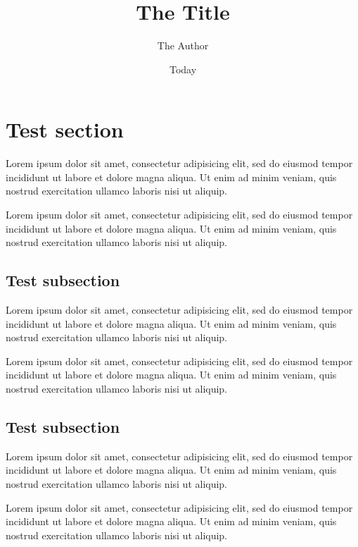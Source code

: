 \documentclass[12pt]{article}
\title{The Title}
\author{The Author}
\date{Today}
\begin{document}
%
%

%
%
\maketitle

%
%

\section{Test section}

Lorem ipsum dolor sit amet, consectetur adipisicing elit, sed do eiusmod
tempor incididunt ut labore et dolore magna aliqua. Ut enim ad minim veniam,
quis nostrud exercitation ullamco laboris nisi ut aliquip.

Lorem ipsum dolor sit amet, consectetur adipisicing elit, sed do eiusmod
tempor incididunt ut labore et dolore magna aliqua. Ut enim ad minim veniam,
quis nostrud exercitation ullamco laboris nisi ut aliquip.

\subsection{Test subsection}

Lorem ipsum dolor sit amet, consectetur adipisicing elit, sed do eiusmod
tempor incididunt ut labore et dolore magna aliqua. Ut enim ad minim veniam,
quis nostrud exercitation ullamco laboris nisi ut aliquip.

Lorem ipsum dolor sit amet, consectetur adipisicing elit, sed do eiusmod
tempor incididunt ut labore et dolore magna aliqua. Ut enim ad minim veniam,
quis nostrud exercitation ullamco laboris nisi ut aliquip.

\subsection{Test subsection}

Lorem ipsum dolor sit amet, consectetur adipisicing elit, sed do eiusmod
tempor incididunt ut labore et dolore magna aliqua. Ut enim ad minim veniam,
quis nostrud exercitation ullamco laboris nisi ut aliquip.

Lorem ipsum dolor sit amet, consectetur adipisicing elit, sed do eiusmod
tempor incididunt ut labore et dolore magna aliqua. Ut enim ad minim veniam,
quis nostrud exercitation ullamco laboris nisi ut aliquip.
\end{document}
